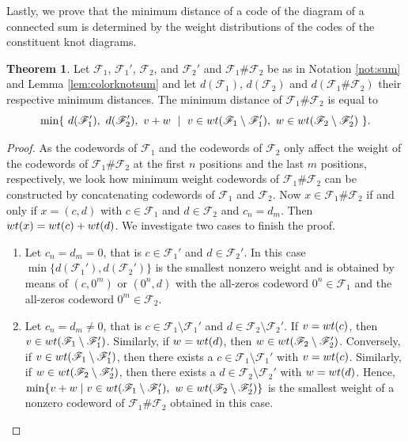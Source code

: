 \documentclass[11pt,a4paper]{article}
\newcommand{\wt}{\textnormal{wt}}
\theoremstyle{definition}
\newtheorem{theorem}{Theorem}[section]
\newcommand{\mF}{\mathcal{F}}
\begin{document}
Lastly, we prove that the minimum distance of a code of the diagram of a connected sum is determined by the weight distributions of the codes of the constituent knot diagrams. 


\begin{theorem}
\label{prop:sumknotmindist}
Let $\mF_1$, $\mF_1'$, $\mF_2$, and $\mF_2'$
and $\mF_1 \# \mF_2$ be as in Notation \ref{not:sum} and Lemma \ref{lem:colorknotsum} and 
let $d(\mF_1)$, $d(\mF_2)$ and $d(\mF_1 \# \mF_2)$ their respective minimum distances.  
The minimum distance of $\mF_1 \# \mF_2$ is equal to 
\begin{equation}
    \min \{ \ d(\mF_1'),\ d(\mF_2'),\ v+w \ \mid \  v \in  \wt(\mF_1 \setminus \mF_1'),\ w \in \wt(\mF_2 \setminus \mF_2') \ \}.
\end{equation}
\end{theorem}

\begin{proof}
As the codewords of $\mF_1$ and the codewords of $\mF_2$ only affect the weight of the codewords of $\mF_1 \# \mF_2$ at the first $n$ positions and the last $m$ positions, respectively, we look how minimum weight codewords of $\mF_1 \# \mF_2$ can be constructed by concatenating codewords of $\mF_1$ and $\mF_2$. 
Now $x \in \mF_1 \# \mF_2$ if and only if $x=(c,d) $ with $c \in \mF_1$ and $d \in \mF_2$  and $c_n = d_m$. Then $\wt(x)=\wt(c)+ \wt(d)$. We investigate two cases to finish the proof.
\begin{enumerate}
    \item Let $c_n = d_m = 0$, that is $c \in \mF_1'$ and $d \in \mF_2'$. 
In this case $\min\{ d(\mF_1'), d(\mF_2') \}$ is the smallest nonzero weight and is obtained by means of $(c, 0^m)$ or $(0^n,d)$ with the all-zeros codeword $0^n \in \mF_1$ and the all-zeros codeword $0^m \in \mF_2$.
    \item Let $c_n = d_m \neq 0$, that is $c \in \mF_1 \setminus \mF_1'$ and $d \in \mF_2 \setminus  \mF_2'$.
If $v =\wt (c)$, then $v \in \wt(\mF_1 \setminus \mF_1')$. Similarly, if $w =\wt (d)$, then $w \in \wt(\mF_2 \setminus \mF_2')$.
Conversely, if $v \in \wt(\mF_1 \setminus \mF_1') $, then there exists a  $c \in \mF_1 \setminus \mF_1'$ with $v =\wt (c)$. 
Similarly, if $w \in \wt(\mF_2 \setminus \mF_2')$, then there exists a  $d \in \mF_2 \setminus \mF_2'$ with $w =\wt (d)$. 
Hence, $\min \{ v+w \mid v \in  \wt(\mF_1 \setminus \mF_1'),\ w \in \wt(\mF_2 \setminus \mF_2')\}$ 
is the smallest weight of a nonzero codeword of $\mF_1 \# \mF_2$ obtained in this case. \qedhere
\end{enumerate}
\end{proof}
\end{document}
